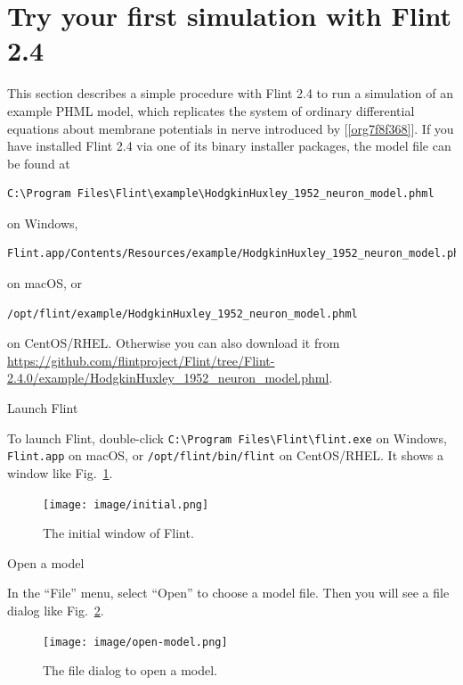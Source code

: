 \documentclass[a4paper,10pt]{report}
\begin{document}
\section{Try your first simulation with Flint 2.4}
\label{sec:orgcb6db35}
This section describes a simple procedure with Flint 2.4 to run a simulation of an
example PHML model, which replicates the system of ordinary differential
equations about membrane potentials in nerve introduced by
[\ref{org7f8f368}].
If you have installed Flint 2.4 via one of its binary installer packages, the
model file can be found at
\begin{verbatim}
C:\Program Files\Flint\example\HodgkinHuxley_1952_neuron_model.phml
\end{verbatim}
on Windows,
\begin{verbatim}
Flint.app/Contents/Resources/example/HodgkinHuxley_1952_neuron_model.phml
\end{verbatim}
on macOS, or
\begin{verbatim}
/opt/flint/example/HodgkinHuxley_1952_neuron_model.phml
\end{verbatim}
on CentOS/RHEL.
Otherwise you can also download it from
\url{https://github.com/flintproject/Flint/tree/Flint-2.4.0/example/HodgkinHuxley\_1952\_neuron\_model.phml}.

\begin{description}
\item[{Launch Flint}] 
\end{description}
To launch Flint, double-click
\texttt{C:\textbackslash{}Program Files\textbackslash{}Flint\textbackslash{}flint.exe} on Windows,
\texttt{Flint.app} on macOS, or \texttt{/opt/flint/bin/flint} on CentOS/RHEL.
It shows a window like Fig.~\ref{fig:orgd70aea0}.
\begin{figure}[htbp]
\centering
\texttt{[image: image/initial.png]}
\caption{\label{fig:orgd70aea0}The initial window of Flint.}
\end{figure}

\begin{description}
\item[{Open a model}] 
\end{description}
In the ``File'' menu, select ``Open'' to choose a model file. Then you will see
a file dialog like Fig.~\ref{fig:org2190557}.

\begin{figure}[htbp]
\centering
\texttt{[image: image/open-model.png]}
\caption{\label{fig:org2190557}The file dialog to open a model.}
\end{figure}
\end{document}
